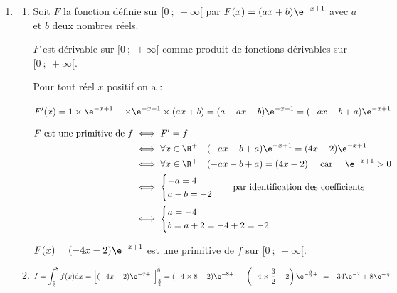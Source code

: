 \begin{enumerate}
\begin{enumerate}
		\begin{center}
		\end{center}

		La fonction $f$ est donc concave sur $\left[0~;~\dfrac{5}{2}\right]$ et convexe sur $\left[\dfrac{5}{2}~;~+\infty\right[$.

		Le point A, d'abscisse  $\dfrac{5}{2}$ est un point d'inflexion de la courbe représentative de $f$.

		\end{enumerate}
	\item

	\begin{enumerate}
		\item  Soit $F$ la fonction définie sur $[0~;~+\infty[$ par $F(x)=(ax+b)\e^{-x+1}$ avec  $a$ et $b$ deux nombres réels.

		$F$  est dérivable sur $[0~;~+\infty[$ comme produit de fonctions dérivables sur $[0~;~+\infty[$.

		Pour tout réel $x$ positif on a :

		$F'(x)= 1 \times \e^{-x+1} - \times \e^{-x+1} \times (ax+b)= (a-ax-b)\e^{-x+1}= (-ax-b+a)\e^{-x+1}$

		$\begin{aligned} F\text{ est une primitive de }f &\iff F'=f\\
		&\iff \forall x \in \R^+ \quad  (-ax-b+a)\e^{-x+1}= (4x-2)\e^{-x+1} \\
		&\iff \forall x \in \R^+ \quad (-ax-b+a)= (4x-2) \quad \text{ car } \quad \e^{-x+1}>0 \\
		&\iff \begin{cases} -a=4 \\ a-b=-2 \end{cases} \quad\text{par identification des coefficients}\\
		&\iff \begin{cases} a=- 4 \\ b=a+2=-4+2=-2 \end{cases}\end{aligned}$

		$F(x)=(-4x-2)\e^{-x+1}$ est une primitive de $f$ sur $[0~;~+\infty[$.

		\item  $\displaystyle  I = \int_{\frac{3}{2}}^8 f(x) \mathrm{d} x = \Big[(-4x-2)\e^{-x+1} \Big]_{\frac{3}{2}}^8
		= (-4\times 8-2)\e^{-8+1} - \left(-4\times \dfrac{3}{2}-2\right)\e^{-\frac{3}{2}+1} = -34\e^{-7}+ 8\e^{-\frac{1}{2}}$


\end{enumerate}
\end{enumerate}
